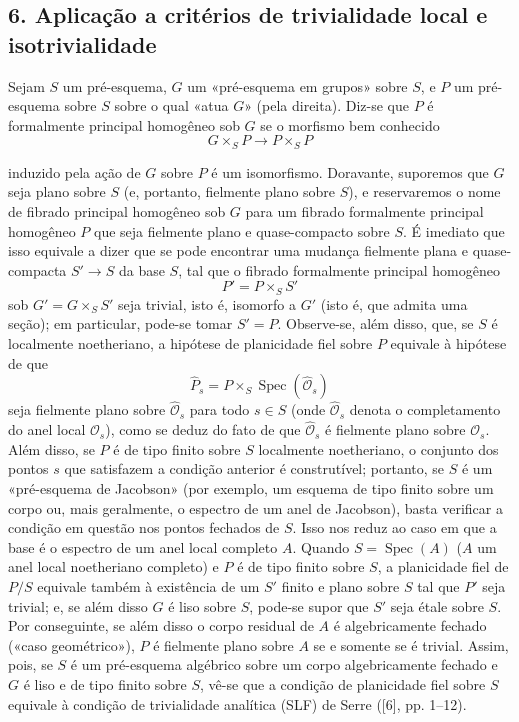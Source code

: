 \documentclass[11pt,twoside,openany]{book}
\numberwithin{equation}{section}
\newcommand{\src}[1]{%
  \phantomsection\hypertarget{src:#1}{}%
  \marginpar{\raggedleft\footnotesize\sffamily #1}%
}
\theoremstyle{plain}
\theoremstyle{definition}
\theoremstyle{remark}
\newcommand{\FgaUnitKey}{frontmatter}
\renewcommand{\src}[1]{%
  \phantomsection\hypertarget{src:\FgaUnitKey:#1}{}%
  \marginpar{\raggedleft\footnotesize\sffamily #1}%
}
\begin{document}
\subsection*{6. Aplicação a critérios de trivialidade local e isotrivialidade}

Sejam $S$ um pré-esquema, $G$ um «pré-esquema em grupos» sobre $S$, e $P$ um
pré-esquema sobre $S$ sobre o qual «atua $G$» (pela direita). Diz-se que $P$
é formalmente principal homogêneo sob $G$ se o morfismo bem conhecido
\[
  G\times_SP\longrightarrow P\times_SP
\]

\src{325}
induzido pela ação de $G$ sobre $P$ é um isomorfismo. Doravante, suporemos que
$G$ seja plano sobre $S$ (e, portanto, fielmente plano sobre $S$), e reservaremos
o nome de fibrado principal homogêneo sob $G$ para um fibrado formalmente
principal homogêneo $P$ que seja fielmente plano e quase-compacto sobre $S$.
É imediato que isso equivale a dizer que se pode encontrar uma mudança
fielmente plana e quase-compacta
$S'\longrightarrow S$ da base $S$, tal que o fibrado formalmente principal
homogêneo
\[
  P'=P\times_SS'
\]
sob $G'=G\times_SS'$ seja trivial, isto é, isomorfo a $G'$ (isto é, que
admita uma seção); em particular, pode-se tomar $S'=P$. Observe-se, além disso,
que, se $S$ é localmente noetheriano, a hipótese de planicidade fiel sobre $P$
equivale à hipótese de que
\[
  \widehat P_s=P\times_S\operatorname{Spec}(\widehat{\mathcal O}_s)
\]
seja fielmente plano sobre $\widehat{\mathcal O}_s$ para todo $s\in S$ (onde
$\widehat{\mathcal O}_s$ denota o completamento do anel local
$\mathcal O_s$), como se deduz do fato de que $\widehat{\mathcal O}_s$ é
fielmente plano sobre $\mathcal O_s$. Além disso, se $P$ é de tipo finito sobre
$S$ localmente noetheriano, o conjunto dos pontos $s$ que satisfazem a
condição anterior é construtível; portanto, se $S$ é um «pré-esquema de
Jacobson» (por exemplo, um esquema de tipo finito sobre um corpo ou, mais
geralmente, o espectro de um anel de Jacobson), basta verificar a
condição em questão nos pontos fechados de $S$. Isso nos reduz ao caso em
que a base é o espectro de um anel local completo $A$. Quando
$S=\operatorname{Spec}(A)$ ($A$ um anel local noetheriano completo) e $P$ é
de tipo finito sobre $S$, a planicidade fiel de $P/S$ equivale também à
existência de um $S'$ finito e plano sobre $S$ tal que $P'$ seja trivial; e, se
além disso $G$ é liso sobre $S$, pode-se supor que $S'$ seja étale sobre $S$.
Por conseguinte, se além disso o corpo residual de $A$ é algebricamente fechado
(«caso geométrico»), $P$ é fielmente plano sobre $A$ se e somente se é trivial.
Assim, pois, se $S$ é um pré-esquema algébrico sobre um corpo algebricamente
fechado e $G$ é liso e de tipo finito sobre $S$, vê-se que a condição de
planicidade fiel sobre $S$ equivale à condição de trivialidade analítica (SLF)
de Serre ([6], pp. 1--12).
\end{document}
